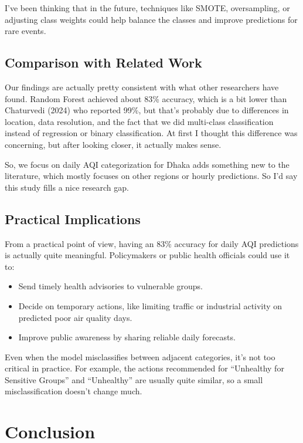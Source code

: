 \documentclass[a4paper,fleqn]{cas-dc}
\begin{document}
I’ve been thinking that in the future, techniques like SMOTE, oversampling, or adjusting class weights could help balance the classes and improve predictions for rare events.

\subsection{Comparison with Related Work}
Our findings are actually pretty consistent with what other researchers have found. Random Forest achieved about 83\% accuracy, which is a bit lower than Chaturvedi (2024) who reported 99\%, but that’s probably due to differences in location, data resolution, and the fact that we did multi-class classification instead of regression or binary classification. At first I thought this difference was concerning, but after looking closer, it actually makes sense.

So, we focus on daily AQI categorization for Dhaka adds something new to the literature, which mostly focuses on other regions or hourly predictions. So I’d say this study fills a nice research gap.

\subsection{Practical Implications}
From a practical point of view, having an 83\% accuracy for daily AQI predictions is actually quite meaningful. Policymakers or public health officials could use it to:

\begin{itemize}
    \item Send timely health advisories to vulnerable groups.
    \item Decide on temporary actions, like limiting traffic or industrial activity on predicted poor air quality days.
    \item Improve public awareness by sharing reliable daily forecasts.
\end{itemize}

Even when the model misclassifies between adjacent categories, it’s not too critical in practice. For example, the actions recommended for ``Unhealthy for Sensitive Groups'' and ``Unhealthy'' are usually quite similar, so a small misclassification doesn’t change much.



\section{Conclusion}
\end{document}

